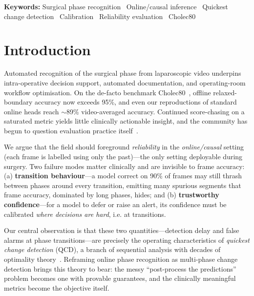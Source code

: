 \documentclass[11pt]{article}
\begin{document}
\smallskip
\noindent\textbf{Keywords:}\; Surgical phase recognition \textperiodcentered\ Online/causal
inference \textperiodcentered\ Quickest change detection \textperiodcentered\ Calibration
\textperiodcentered\ Reliability evaluation \textperiodcentered\ Cholec80

\section{Introduction}
Automated recognition of the surgical phase from laparoscopic video underpins
intra-operative decision support, automated documentation, and operating-room
workflow optimisation. On the de-facto benchmark Cholec80~\cite{twinanda2017},
offline relaxed-boundary accuracy now exceeds 95\%, and even our reproductions of
standard online heads reach $\sim$89\% video-averaged accuracy. Continued
score-chasing on a saturated metric yields little clinically actionable insight,
and the community has begun to question evaluation practice
itself~\cite{funke2023}.

We argue that the field should foreground \emph{reliability} in the
\emph{online/causal} setting (each frame is labelled using only the past)---the
only setting deployable during surgery. Two failure modes matter clinically and are
invisible to frame accuracy: (a) \textbf{transition behaviour}---a model correct on
90\% of frames may still thrash between phases around every transition, emitting
many spurious segments that frame accuracy, dominated by long phases, hides; and
(b) \textbf{trustworthy confidence}---for a model to defer or raise an alert, its
confidence must be calibrated \emph{where decisions are hard}, i.e. at transitions.

Our central observation is that these two quantities---detection delay and false
alarms at phase transitions---are precisely the operating characteristics of
\emph{quickest change detection} (QCD), a branch of sequential analysis with
decades of optimality theory~\cite{page1954,lorden1971,moustakides1986}. Reframing
online phase recognition as multi-phase change detection brings this theory to bear:
the messy ``post-process the predictions'' problem becomes one with provable
guarantees, and the clinically meaningful metrics become the objective itself.
\end{document}
